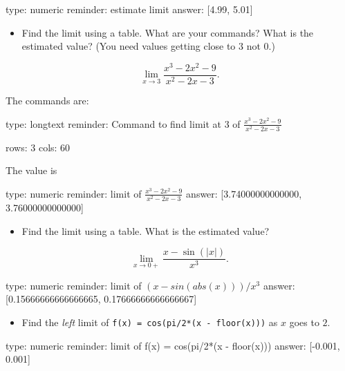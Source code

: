 \documentclass[12pt]{article}
\begin{document}
\begin{answer}
    type: numeric
    reminder: estimate limit
    answer: [4.99, 5.01]

\end{answer}

\begin{itemize}
\itemsep1pt\parskip0pt
\item
  Find the limit using a table. What are your commands? What is the
  estimated value? (You need values getting close to $3$ not $0$.)
\end{itemize}

\[
\lim_{x \rightarrow 3} \frac{x^3 - 2x^2 -9}{x^2 - 2x -3}.
\]

The commands are:

\begin{answer}
type: longtext
reminder: Command to find limit at 3 of \( \frac{x^3 - 2x^2 -9}{x^2 - 2x -3} \)

rows: 3
cols: 60
\end{answer}

The value is

\begin{answer}
    type: numeric
    reminder: limit of \( \frac{x^3 - 2x^2 -9}{x^2 - 2x -3} \)
    answer: [3.74000000000000, 3.76000000000000]

\end{answer}

\begin{itemize}
\itemsep1pt\parskip0pt
\item
  Find the limit using a table. What is the estimated value?
\end{itemize}

\[
\lim_{x \rightarrow 0+} \frac{x - \sin(\vert x\vert )}{x^3}.
\]

\begin{answer}
    type: numeric
    reminder: limit of \( (x - sin(abs(x)))/x^3 \)
    answer: [0.15666666666666665, 0.17666666666666667]

\end{answer}

\begin{itemize}
\itemsep1pt\parskip0pt
\item
  Find the \emph{left} limit of \texttt{f(x) = cos(pi/2*(x - floor(x)))}
  as $x$ goes to $2$.
\end{itemize}

\begin{answer}
    type: numeric
    reminder: limit of f(x) = cos(pi/2*(x - floor(x)))
    answer: [-0.001, 0.001]

\end{answer}
\end{document}
